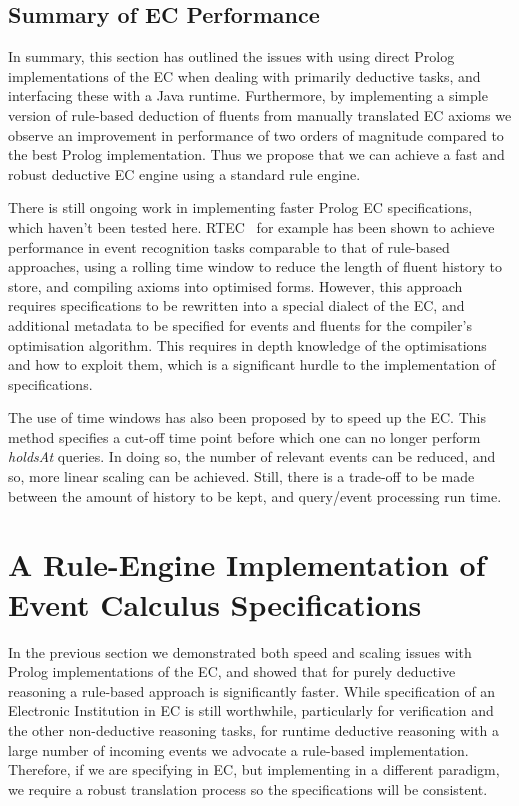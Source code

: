 \subsection{Summary of \acl{EC} Performance}

In summary, this section has outlined the issues with using direct Prolog
implementations of the \ac{EC} when dealing with primarily deductive tasks,
and interfacing these with a Java runtime. Furthermore, by implementing a
simple version of rule-based deduction of fluents from manually translated \ac{EC}
axioms we observe an improvement in performance of two orders of
magnitude compared to the best Prolog implementation. Thus we propose that we can achieve a fast and robust deductive
\ac{EC} engine using a standard rule engine.

There is still ongoing work in implementing faster Prolog \ac{EC}
specifications, which haven't been tested here. RTEC~\citep{Artikis2012} for
example has been shown to achieve performance in event recognition tasks
comparable to that of rule-based approaches, using a rolling time window to
reduce the length of fluent history to store, and compiling axioms into
optimised forms. However, this approach requires specifications to be
rewritten into a special dialect of the \ac{EC}, and additional metadata to be
specified for events and fluents for the compiler's optimisation algorithm. 
This requires in depth knowledge of the optimisations and how to exploit them, 
which is a significant hurdle to the implementation of specifications.

The use of time windows has also been proposed by \citet{Carr2010} to speed up
the \ac{EC}. This method specifies a cut-off time point before which one can
no longer perform \emph{holdsAt} queries. In doing so, the number of relevant
events can be reduced, and so, more linear scaling can be achieved. Still, there is
 a trade-off to be made between the amount of history to be kept, and
query/event processing run time.

\section{A Rule-Engine Implementation of Event Calculus Specifications}

In the previous section we demonstrated both speed and scaling issues with
Prolog implementations of the \ac{EC}, and showed that for purely deductive
reasoning a rule-based approach is significantly faster. While specification
of an Electronic Institution in \ac{EC} is still worthwhile, particularly for
verification and the other non-deductive reasoning tasks, for runtime
deductive reasoning with a large number of incoming events we advocate a 
rule-based implementation. Therefore, if we are specifying in \ac{EC}, but
implementing in a different paradigm, we require a robust translation process
so the specifications will be consistent.

